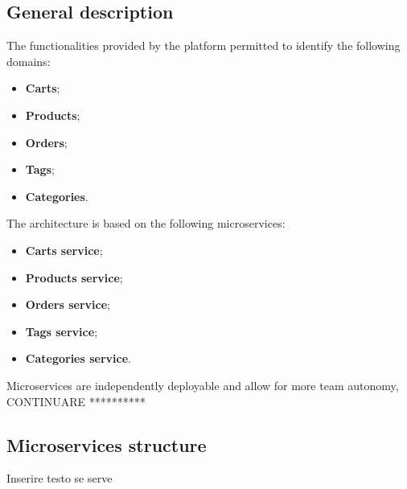 \subsection{General description}
The functionalities provided by the platform permitted to identify the following domains:
\begin{itemize}
    \item \textbf{Carts};
    \item \textbf{Products};
    \item \textbf{Orders};
    \item \textbf{Tags};
    \item \textbf{Categories}.
\end{itemize}
The architecture is based on the following microservices:
\begin{itemize}
    \item \textbf{Carts service};
    \item \textbf{Products service};
    \item \textbf{Orders service};
    \item \textbf{Tags service};
    \item \textbf{Categories service}.
\end{itemize}
Microservices are independently deployable and allow for more team autonomy, CONTINUARE **********
\pagebreak
\subsection{Microservices structure}
Inserire testo se serve
